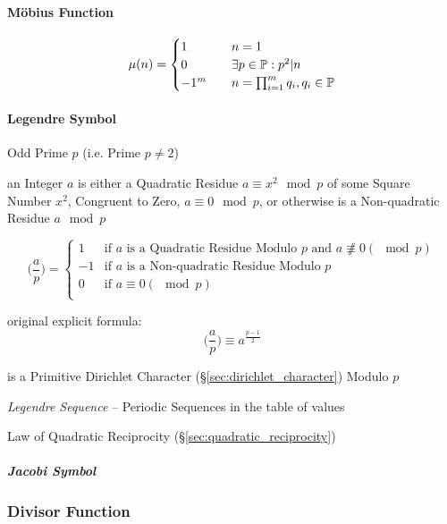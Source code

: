 \paragraph{M\"obius Function}\label{sec:mobius_function}\hfill

\[
  \mu(n) =
  \begin{cases}
  1     & \quad n = 1 \\
  0     & \quad \exists p \in \mathbb{P} : p^2|n \\
  -1^m  & \quad n = \prod_{i = 1}^m q_i, q_i \in \mathbb{P} \\
  \end{cases}
\]



\paragraph{Legendre Symbol}\label{sec:legendre_symbol}\hfill

Odd Prime $p$ (i.e. Prime $p \neq 2$)

an Integer $a$ is either a Quadratic Residue $a \equiv x^2 \mod p$ of some
Square Number $x^2$, Congruent to Zero, $a \equiv 0 \mod p$, or otherwise is
a Non-quadratic Residue $a \mod p$

\[
  \Big(\frac{a}{p}\Big) = \begin{cases}
    1  & \text{if }a\text{ is a Quadratic Residue Modulo }p\text{ and }
          a \not\nequiv 0 (\mod p) \\
    -1 & \text{if }a\text{ is a Non-quadratic Residue Modulo }p \\
    0  & \text{if }a \equiv 0 (\mod p) \\
  \end{cases}
\]

original explicit formula:
\[
  \Big(\frac{a}{p}\Big) \equiv a^{\frac{p-1}{2}}
\]

is a Primitive Dirichlet Character (\S\ref{sec:dirichlet_character}) Modulo $p$

\emph{Legendre Sequence} -- Periodic Sequences in the table of values

\fist Law of Quadratic Reciprocity (\S\ref{sec:quadratic_reciprocity})



\subparagraph{Jacobi Symbol}\label{sec:jacobi_symbol}\hfill



\subsubsection{Divisor Function}\label{sec:divisor_function}

